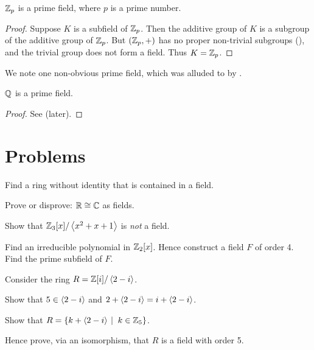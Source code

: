\begin{theorem}
    $\mathbb{Z}_p$ is a prime field, where $p$ is a prime number.
\end{theorem}
\begin{proof}
    Suppose $K$ is a subfield of $\mathbb{Z}_p$. Then the additive group of $K$ is a subgroup of the additive group of $\mathbb{Z}_p$. But $(\mathbb{Z}_p, +)$ has no proper non-trivial subgroups (), and the trivial group does not form a field. Thus $K = \mathbb{Z}_p$.
\end{proof}

We note one non-obvious prime field, which was alluded to by .

\begin{theorem}\label{thrm-Q-is-prime-field}
    $\mathbb{Q}$ is a prime field.
\end{theorem}
\begin{proof}
    See  (later).
\end{proof}

\newpage

\section{Problems}
\begin{problem}
    Find a ring without identity that is contained in a field.
\end{problem}

\begin{problem}
    Prove or disprove: $\mathbb{R} \cong \mathbb{C}$ as fields.
\end{problem}

\begin{problem}
    Show that $\mathbb{Z}_3[x]/\left\langle x^2+x+1\right\rangle$ is \textit{not} a field.
\end{problem}

\begin{problem}
    Find an irreducible polynomial in $\mathbb{Z}_2[x]$. Hence construct a field $F$ of order 4. Find the prime subfield of $F$.
\end{problem}

\begin{problem}
    Consider the ring $R = \mathbb{Z}[i] / \left\langle2-i\right\rangle$.
    \begin{partquestions}{\roman*}
        \item Show that $5 \in \left\langle2-i\right\rangle$ and $2 + \left\langle2-i\right\rangle = i + \left\langle2-i\right\rangle$.
        \item Show that $R = \{k + \princ{2-i} \vert k \in \Z_5\}$.
        \item Hence prove, via an isomorphism, that $R$ is a field with order 5.
    \end{partquestions}
\end{problem}


